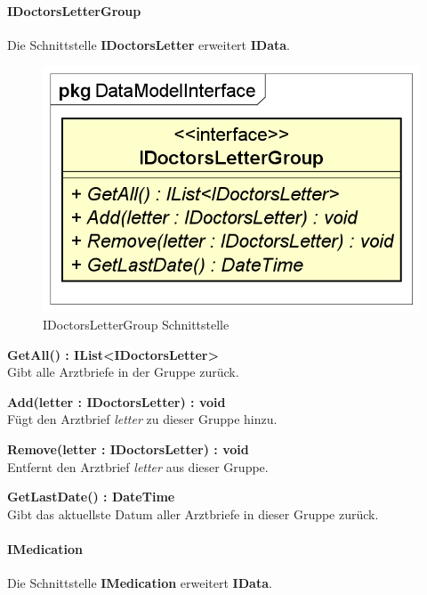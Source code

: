 \documentclass[a4paper]{scrreprt}
\begin{document}
\paragraph{IDoctorsLetterGroup}
Die Schnittstelle \textbf{IDoctorsLetter} erweitert \textbf{IData}.

\begin{figure}[H]
\centering
\includegraphics[width=0.45\textheight]{graphics/Klassendiagramme/Model/IDoctorsLetterGroup.png}
\caption{IDoctorsLetterGroup Schnittstelle}
\end{figure}
\textbf{GetAll() : IList<IDoctorsLetter>}\\
Gibt alle Arztbriefe in der Gruppe zurück.

\textbf{Add(letter : IDoctorsLetter) : void}\\
Fügt den Arztbrief \textit{letter} zu dieser Gruppe hinzu.

\textbf{Remove(letter : IDoctorsLetter) : void}\\
Entfernt den Arztbrief \textit{letter} aus dieser Gruppe.

\textbf{GetLastDate() : DateTime}\\
Gibt das aktuellste Datum aller Arztbriefe in dieser Gruppe zurück.

\paragraph{IMedication}
Die Schnittstelle \textbf{IMedication} erweitert \textbf{IData}.
\end{document}
